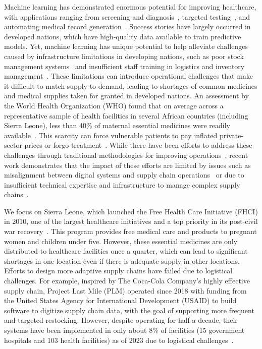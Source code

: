 \documentclass[12pt]{article}
\begin{document}
Machine learning has demonstrated enormous potential for improving healthcare, with applications ranging from screening and diagnosis~\cite{de2018clinically, esteva2019guide, ngiam2019big}, targeted testing~\cite{bastani2021efficient}, and automating medical record generation~\cite{yang2022large}. Success stories have largely occurred in developed nations, which have high-quality data available to train predictive models. Yet, machine learning has unique potential to help alleviate challenges caused by infrastructure limitations in developing nations, such as poor stock management systems~\cite{zuma2019challenges} and insufficient staff training in logistics and inventory management~\cite{gallien2021inventory, yadav2015health}. These limitations can introduce operational challenges that make it difficult to match supply to demand, leading to shortages of common medicines and medical supplies taken for granted in developed nations. An assessment by the World Health Organization (WHO) found that on average across a representative sample of health facilities in several African countries (including Sierra Leone), less than 40\% of maternal essential medicines were readily available~\cite{whosara2018,droti2019poor}. This scarcity can force vulnerable patients to pay inflated private-sector prices or forgo treatment~\cite{yenet2023challenges}. While there have been efforts to address these challenges through traditional methodologies for improving operations~\cite{tetteh2009creating, terwiesch2006matching, fenta2017human, johnson2021inventory}, recent work demonstrates that the impact of these efforts are limited by issues such as misalignment between digital systems and supply chain operations~\cite{mwashiuya2025effect} or due to insufficient technical expertise and infrastructure to manage complex supply chains~\cite{braa2007building}.

We focus on Sierra Leone, which launched the Free Health Care Initiative (FHCI) in 2010, one of the largest healthcare initiatives and a top priority in its post-civil war recovery~\cite{donnelly2011did}. This program provides free medical care and products to pregnant women and children under five. However, these essential medicines are only distributed to healthcare facilities once a quarter, which can lead to significant shortages in one location even if there is adequate supply in other locations. Efforts to design more adaptive supply chains have failed due to logistical challenges. For example, inspired by The Coca-Cola Company's highly effective supply chain, Project Last Mile (PLM) operated since 2018 with funding from the United States Agency for International Development (USAID) to build software to digitize supply chain data, with the goal of supporting more frequent and targeted restocking. However, despite operating for half a decade, their systems have been implemented in only about 8\% of facilities (15 government hospitals and 103 health facilities) as of 2023 due to logistical challenges~\cite{linnander2017process,linnander2018mixed,projectlastmile2023}.
\end{document}
